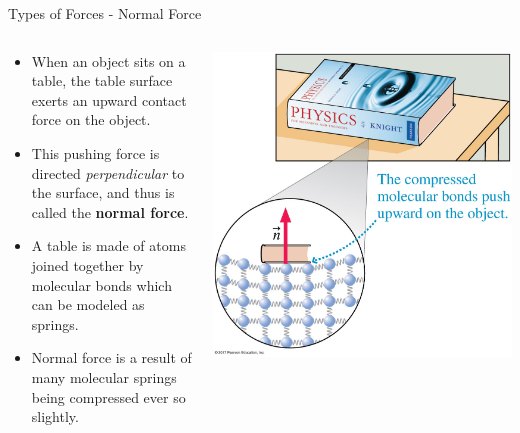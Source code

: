 \documentclass{beamer}
\begin{document}
\begin{frame}{Types of Forces - Normal Force}
\begin{columns}
\begin{column}{0.6\textwidth}
\begin{itemize}
   \item When an object sits on a table, the table surface exerts an upward 
contact force on the object.
   \item This pushing force is directed {\it perpendicular} to the surface, and thus is called the {\bf normal force}.
   \item A table is made of atoms joined together by molecular bonds which can be modeled as springs.
   \item Normal force is a result of many molecular springs being compressed ever so slightly.
\end{itemize}
\end{column}
\begin{column}{0.4\textwidth}
\begin{center}
   \includegraphics[width=\textwidth]{../figures/05_06_Figure.jpg}
\end{center}
\end{column}
\end{columns}
\end{frame}
\end{document}
